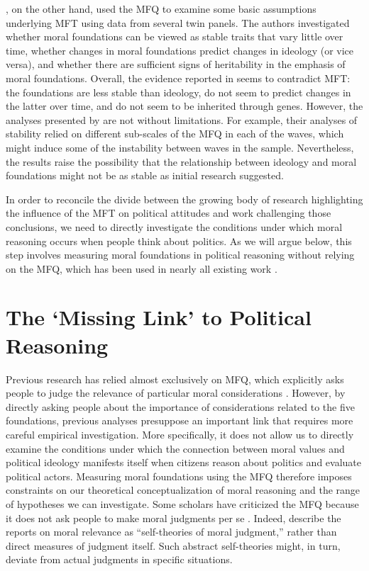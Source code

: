 \documentclass[12pt]{article}
\begin{document}
\citet{smith2016intuitive}, on the other hand, used the MFQ to examine some basic assumptions underlying MFT using data from several twin panels. The authors investigated whether moral foundations can be viewed as stable traits that vary little over time, whether changes in moral foundations predict changes in ideology (or vice versa), and whether there are sufficient signs of heritability in the emphasis of moral foundations. Overall, the evidence reported in \citet{smith2016intuitive} seems to contradict MFT: the foundations are less stable than ideology, do not seem to predict changes in the latter over time, and do not seem to be inherited through genes. However, the analyses presented by \citet{smith2016intuitive} are not without limitations. For example, their analyses of stability relied on different sub-scales of the MFQ in each of the waves, which might induce some of the instability between waves in the sample. Nevertheless, the results raise the possibility that the relationship between ideology and moral foundations might not be as stable as initial research suggested.

In order to reconcile the divide between the growing body of research highlighting the influence of the MFT on political attitudes and work challenging those conclusions, we need to directly investigate the conditions under which moral reasoning occurs when people think about politics. As we will argue below, this step involves measuring moral foundations in political reasoning without relying on the MFQ, which has been used in nearly all existing work \citep[but see][]{clifford2014linking}.


\section*{The `Missing Link' to Political Reasoning}

Previous research has relied almost exclusively on MFQ, which explicitly asks people to judge the relevance of particular moral considerations \citep[e.g.][]{graham2011mapping}. However, by directly asking people about the importance of considerations related to the five foundations, previous analyses presuppose an important link that requires more careful empirical investigation. More specifically, it does not allow us to directly examine the conditions under which the connection between moral values and political ideology manifests itself when citizens reason about politics and evaluate political actors. Measuring moral foundations using the MFQ therefore imposes constraints on our theoretical conceptualization of moral reasoning and the range of hypotheses we can investigate. Some scholars have criticized the MFQ because it does not ask people to make moral judgments per se \citep[e.g.][]{clifford2015moral}. Indeed, \citet[1031]{graham2009liberals} describe the reports on moral relevance as ``self-theories of moral judgment,'' rather than direct measures of judgment itself. Such abstract self-theories might, in turn, deviate from actual judgments in specific situations.
\end{document}
